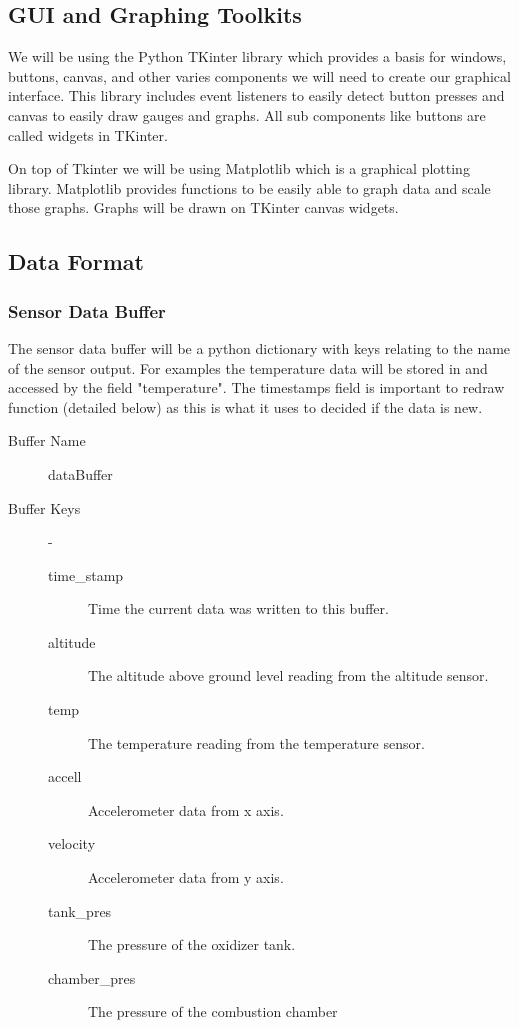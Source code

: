 \documentclass[10pt,draftclsnofoot,onecolumn,compsoc]{IEEEtran}
\begin{document}
\subsection{GUI and Graphing Toolkits}
We will be using the Python TKinter library which provides a basis for windows, buttons, canvas, and other varies components we will need to create our graphical interface. This library includes event listeners to easily detect button presses and canvas to easily draw gauges and graphs. All sub components like buttons are called widgets in TKinter. \par
On top of Tkinter we will be using Matplotlib which is a graphical plotting library. Matplotlib provides functions to be easily able to graph data and scale those graphs. Graphs will be drawn on TKinter canvas widgets.\par

\subsection{Data Format}
\subsubsection{Sensor Data Buffer}
The sensor data buffer will be a python dictionary with keys relating to the name of the sensor output. For examples the temperature data will be stored in and accessed by the field "temperature".  The timestamps field is important to redraw function (detailed below) as this is what it uses to decided if the data is new.
\begin{description}
	\item[Buffer Name] dataBuffer
	\item[Buffer Keys]  -
		\begin{description}
			\item[time\_stamp] Time the current data was written to this buffer.
			\item[altitude] The altitude above ground level reading from the altitude sensor.
			\item[temp] The temperature reading from the temperature sensor.
			\item[accell] Accelerometer data from x axis.
			\item[velocity] Accelerometer data from y axis.
			\item[tank\_pres] The pressure of the oxidizer tank.
			\item[chamber\_pres] The pressure of the combustion chamber
		\end{description}
\end{description}
\end{document}

